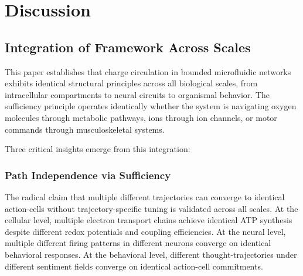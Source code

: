 \documentclass[twocolumn,11pt,a4paper]{article}
\begin{document}











\section{Discussion}
\label{sec:discussion}

\subsection{Integration of Framework Across Scales}

This paper establishes that charge circulation in bounded microfluidic networks exhibits identical structural principles across all biological scales, from intracellular compartments to neural circuits to organismal behavior. The sufficiency principle operates identically whether the system is navigating oxygen molecules through metabolic pathways, ions through ion channels, or motor commands through musculoskeletal systems.

Three critical insights emerge from this integration:

\subsubsection{Path Independence via Sufficiency}

The radical claim that multiple different trajectories can converge to identical action-cells without trajectory-specific tuning is validated across all scales. At the cellular level, multiple electron transport chains achieve identical ATP synthesis despite different redox potentials and coupling efficiencies. At the neural level, multiple different firing patterns in different neurons converge on identical behavioral responses. At the behavioral level, different thought-trajectories under different sentiment fields converge on identical action-cell commitments.
\end{document}
